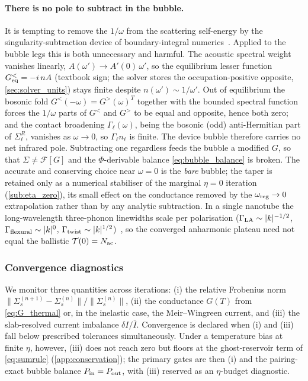 \paragraph{There is no pole to subtract in the bubble.}
It is tempting to remove the $1/\omega$ from the scattering self-energy by the
singularity-subtraction device of boundary-integral
numerics~\cite{helsing_higher_2013,hanninen_singularity_2006,wang_logarithmic_2023}.
Applied to the bubble legs this is both unnecessary and harmful.
The acoustic spectral weight vanishes
linearly, $A(\omega')\to A'(0)\,\omega'$, so the equilibrium lesser function
$G^{<}_{\rm eq}=-i\,nA$ (textbook sign; the solver stores the
occupation-positive opposite, \cref{sec:solver_units}) stays finite despite
$n(\omega')\sim1/\omega'$. Out of equilibrium the bosonic fold
$G^{<}(-\omega)=G^{>}(\omega)^T$ together with the bounded spectral function forces
the $1/\omega$ parts of $G^{<}$ and $G^{>}$ to be equal and opposite, hence both
zero; and the contact broadening $\Gamma_\ell(\omega)$, being the bosonic (odd)
anti-Hermitian part of $\Sigma^R_\ell$, vanishes as $\omega\to0$, so
$\Gamma_\ell n_\ell$ is finite. The device bubble therefore carries no net infrared
pole. Subtracting one regardless feeds the bubble a modified $G$, so that
$\Sigma\neq\mathcal{F}[G]$ and the $\Phi$-derivable balance \cref{eq:bubble_balance}
is broken. The accurate and conserving choice near $\omega=0$ is the \emph{bare}
bubble; the taper is retained only as a numerical stabiliser of the marginal
$\eta=0$ iteration (\cref{sub:eta_zero}), its small effect on the conductance
removed by the $\omega_{\rm reg}\to0$ extrapolation rather than by any analytic
subtraction. In a single nanotube the long-wavelength three-phonon linewidths scale
per polarisation ($\Gamma_{\rm LA}\sim|k|^{-1/2}$, $\Gamma_{\rm flexural}\sim|k|^{0}$,
$\Gamma_{\rm twist}\sim|k|^{1/2}$)~\cite{bruns_nanotube_2021,ma_examining_2014,maznev_demystifying_2014},
so the converged anharmonic plateau need not equal the ballistic
$\mathcal{T}(0)=N_{\rm ac}$.

\subsubsection{Convergence diagnostics}

We monitor three quantities across iterations: (i) the relative
Frobenius norm
$\|\Sigma_s^{(n+1)}-\Sigma_s^{(n)}\|/\|\Sigma_s^{(n)}\|$,
(ii) the conductance $G(T)$ from \cref{eq:G_thermal} or, in the
inelastic case, the Meir--Wingreen current, and (iii) the slab-resolved
current imbalance $\delta I/\bar I$. Convergence is declared when (i)
and (iii) fall below prescribed tolerances simultaneously. Under a
temperature bias at finite $\eta$, however, (iii) does not reach zero but
floors at the ghost-reservoir term of \cref{eq:sumrule}
(\cref{app:conservation}); the primary gates are then (i) and the
pairing-exact bubble balance $P_{\rm in}=P_{\rm out}$, with (iii) reserved as
an $\eta$-budget diagnostic.

